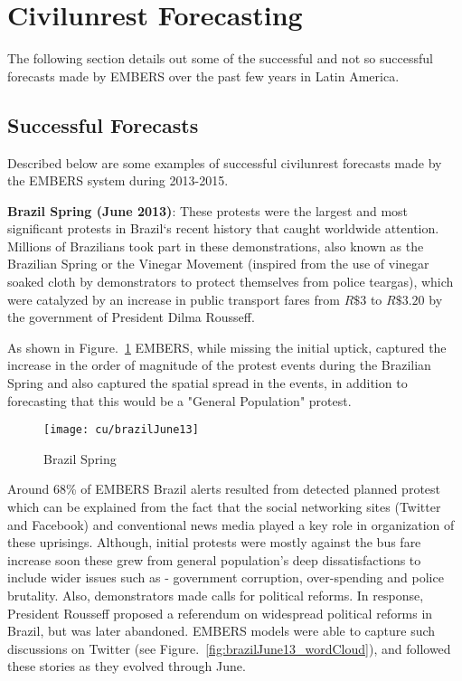 \section{Civilunrest Forecasting}
The following section details out some of the successful and not so
successful forecasts made by EMBERS over the past few years in Latin America.
\subsection{Successful Forecasts}
Described below are some examples of successful civilunrest
forecasts made by the EMBERS system during 2013-2015.

\textbf{Brazil Spring (June 2013)}: These protests were the largest and most
significant protests in Brazil`s recent history that caught worldwide
attention. Millions of Brazilians took part in these demonstrations,
also known as the Brazilian Spring or the Vinegar Movement (inspired
from the use of vinegar soaked cloth by demonstrators to protect
themselves from police teargas), which were catalyzed by an increase in
public transport fares from $R\$3$ to $R\$3.20$ by the government of President
Dilma Rousseff.

As shown in Figure.~\ref{fig:brazilJune13} EMBERS, while missing the initial uptick,
captured the increase in the order of magnitude of the protest events
during the Brazilian Spring and also captured
the spatial spread in the events, in addition to forecasting that this would be
a "General Population" protest.

\begin{figure}[H]
\centering
\texttt{[image: cu/brazilJune13]}
\caption{Brazil Spring}
\label{fig:brazilJune13}
\end{figure}

Around 68\% of EMBERS Brazil alerts resulted from detected planned
protest which can be explained from the fact that the social networking
sites (Twitter and Facebook) and conventional news media played a key
role in organization of these uprisings. Although, initial protests were
mostly against the bus fare increase soon these grew from general
population's deep dissatisfactions to include wider issues such as -
government corruption, over-spending and police brutality. Also,
demonstrators made calls for political reforms. In response, President
Rousseff proposed a referendum on widespread political reforms in
Brazil, but was later abandoned. EMBERS models were able to capture such
discussions on Twitter (see Figure.~\ref{fig:brazilJune13_wordCloud}), and followed these stories as
they evolved through June.

